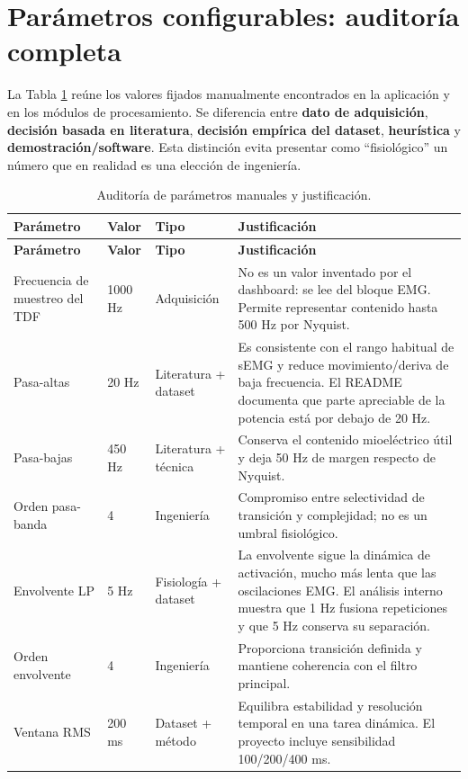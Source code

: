 \documentclass[11pt,spanish]{article}
\begin{document}
\section{Parámetros configurables: auditoría completa}

La Tabla \ref{tab:parametros} reúne los valores fijados manualmente encontrados en la aplicación y en los módulos de procesamiento. Se diferencia entre \textbf{dato de adquisición}, \textbf{decisión basada en literatura}, \textbf{decisión empírica del dataset}, \textbf{heurística} y \textbf{demostración/software}. Esta distinción evita presentar como ``fisiológico'' un número que en realidad es una elección de ingeniería.

\begin{longtable}{p{3.2cm}p{1.7cm}p{2.2cm}p{7.0cm}}
\caption{Auditoría de parámetros manuales y justificación.}
\label{tab:parametros}\\
\toprule
\textbf{Parámetro} & \textbf{Valor} & \textbf{Tipo} & \textbf{Justificación}\\
\midrule
\endfirsthead
\toprule
\textbf{Parámetro} & \textbf{Valor} & \textbf{Tipo} & \textbf{Justificación}\\
\midrule
\endhead
Frecuencia de muestreo del TDF & 1000 Hz & Adquisición & No es un valor inventado por el dashboard: se lee del bloque EMG. Permite representar contenido hasta 500 Hz por Nyquist.\\
Pasa-altas & 20 Hz & Literatura + dataset & Es consistente con el rango habitual de sEMG y reduce movimiento/deriva de baja frecuencia. El README documenta que parte apreciable de la potencia está por debajo de 20 Hz.\\
Pasa-bajas & 450 Hz & Literatura + técnica & Conserva el contenido mioeléctrico útil y deja 50 Hz de margen respecto de Nyquist.\\
Orden pasa-banda & 4 & Ingeniería & Compromiso entre selectividad de transición y complejidad; no es un umbral fisiológico.\\
Envolvente LP & 5 Hz & Fisiología + dataset & La envolvente sigue la dinámica de activación, mucho más lenta que las oscilaciones EMG. El análisis interno muestra que 1 Hz fusiona repeticiones y que 5 Hz conserva su separación.\\
Orden envolvente & 4 & Ingeniería & Proporciona transición definida y mantiene coherencia con el filtro principal.\\
Ventana RMS & 200 ms & Dataset + método & Equilibra estabilidad y resolución temporal en una tarea dinámica. El proyecto incluye sensibilidad 100/200/400 ms.\\

\end{longtable}
\end{document}
